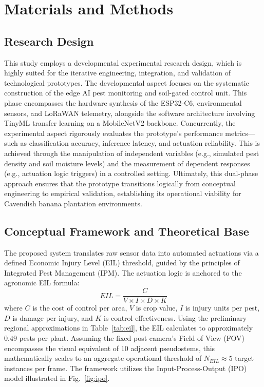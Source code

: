 \documentclass[conference]{IEEEtran}
\begin{document}
\section{Materials and Methods}

\subsection{Research Design}
This study employs a developmental experimental research design, which is highly suited for the iterative engineering, integration, and validation of technological prototypes. The developmental aspect focuses on the systematic construction of the edge AI pest monitoring and soil-gated control unit. This phase encompasses the hardware synthesis of the ESP32-C6, environmental sensors, and LoRaWAN telemetry, alongside the software architecture involving TinyML transfer learning on a MobileNetV2 backbone. Concurrently, the experimental aspect rigorously evaluates the prototype's performance metrics—such as classification accuracy, inference latency, and actuation reliability. This is achieved through the manipulation of independent variables (e.g., simulated pest density and soil moisture levels) and the measurement of dependent responses (e.g., actuation logic triggers) in a controlled setting. Ultimately, this dual-phase approach ensures that the prototype transitions logically from conceptual engineering to empirical validation, establishing its operational viability for Cavendish banana plantation environments.

\subsection{Conceptual Framework and Theoretical Base}
The proposed system translates raw sensor data into automated actuations via a defined Economic Injury Level (EIL) threshold, guided by the principles of Integrated Pest Management (IPM). The actuation logic is anchored to the agronomic EIL formula:
\begin{equation}
EIL = \frac{C}{V \times I \times D \times K}
\end{equation}
where $C$ is the cost of control per area, $V$ is crop value, $I$ is injury units per pest, $D$ is damage per injury, and $K$ is control effectiveness. Using the preliminary regional approximations in Table~\ref{tab:eil}, the EIL calculates to approximately $0.49$ pests per plant. Assuming the fixed-post camera's Field of View (FOV) encompasses the visual equivalent of 10 adjacent pseudostems, this mathematically scales to an aggregate operational threshold of $N_{EIL} \approx 5$ target instances per frame. The framework utilizes the Input-Process-Output (IPO) model illustrated in Fig.~\ref{fig:ipo}.
\end{document}
